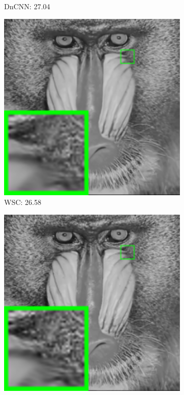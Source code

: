 \begin{figure}
\begin{adjustwidth}{-2cm}{}
\begin{subfigure}[t]{0.19\textwidth}
		\caption{DnCNN: 27.04}
    \end{subfigure}
    \hfill
    \begin{subfigure}[t]{0.19\textwidth}
        \centering
        \includegraphics[width=1\textwidth]{images/twsc/awgn/resize_br_WSC_20_baboon.png}
		\caption{WSC: 26.58}
    \end{subfigure}
    \hfill
    \begin{subfigure}[t]{0.19\textwidth}
        \centering
        \includegraphics[width=1\textwidth]{images/twsc/awgn/resize_br_WLSWSC_20_baboon.png}

\end{subfigure}
\end{adjustwidth}
\end{figure}

